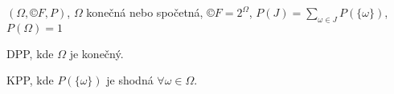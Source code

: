 \documentclass[12pt]{article}					%
\begin{document}
    \begin{definice}
        $(\Omega, ©F, P)$, $\Omega$ konečná nebo spočetná, $©F = 2^{\Omega}$, $P(J) = \sum_{\omega \in J} P(\{\omega\})$, $P(\Omega) = 1$
    \end{definice}

    \begin{definice}[Konečný PP]
        DPP, kde $\Omega$ je konečný.
    \end{definice}

    \begin{definice}[Klasický PP]
        KPP, kde $P(\{\omega\})$ je shodná $\forall \omega \in \Omega$.
    \end{definice}
\end{document}
